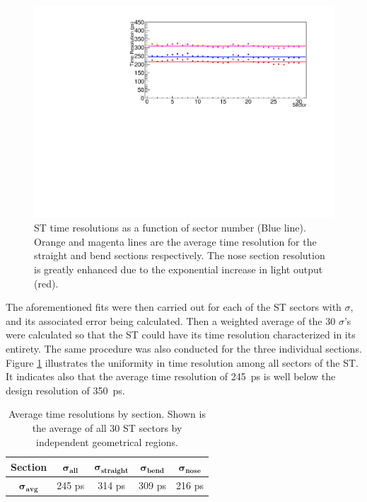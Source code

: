 \begin{figure}[!htb]
		\centering
		\includegraphics[width=1.08\columnwidth]{performance/figs/TR_All}
		\caption{ST time resolutions as a function of sector number (Blue line). Orange and magenta lines are the average time resolution for the straight and bend sections respectively. The nose section resolution is greatly enhanced due to the exponential increase in light output (red).}
		\label{fig:timeresallinset}
	\end{figure}		
The aforementioned fits were then carried out for each of the ST sectors with $\sigma$, and its associated error being calculated.  Then a weighted average of the 30 $\sigma$'s were calculated so that the ST could have its time resolution characterized in its entirety.  The same procedure was also conducted for the three individual sections.  Figure \ref{fig:timeresallinset} illustrates the uniformity in time resolution among all sectors of the ST. It indicates also that the average time resolution of 245~ps is well below the design resolution of 350~ps.
\begin{table}[ch]
	\centering
	\begin{tabular}{|c|c|c|c|c|}
		\hline  \textbf{Section} & $\mathbf{\sigma_{all}}$ & $\mathbf{\sigma_{straight}}$ & $\mathbf{\sigma_{bend}}$ & $\mathbf{\sigma_{nose}}$ \\ 
		\hline $\mathbf{\sigma_{avg}}$ & 245 ps & 314 ps & 309 ps & 216 ps \\ 
		\hline 
	\end{tabular}
	\caption[Average time resolutions by section]{Average time resolutions by section. Shown is the average of all 30 ST sectors by independent geometrical regions.}
	\label{tab:time_res_section}
\end{table}

